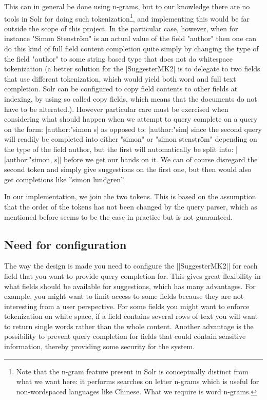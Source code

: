 This can in general be done using n-grams, but to our knowledge there are no tools in Solr for doing such tokenization\footnote{Note that the n-gram feature present in Solr is conceptually distinct from what we want here: it performs searches on letter n-grams which is useful for non-wordspaced languages like Chinese. What we require is word n-grams.}, and implementing this would be far outside the scope of this project. In the particular case, however, when for instance "Simon Stenström" is an actual value of the field "author" then one can do this kind of full field content completion quite simply by changing the type of the field "author" to some string based type that does not do whitespace tokenization (a better solution for the |SuggesterMK2| is to delegate to two fields that use different tokenization, which would yield both word and full text completion. Solr can be configured to copy field contents to other fields at indexing, by using so called copy fields, which means that the documents do not have to be alterated.).
However particular care must be exercised when considering what should happen when we attempt to query complete on a query on the form: |author:"simon s| as opposed to: |author:"sim| since the second query will readily be completed into either "simon" or "simon stenström" depending on the type of the field author, but the first will automatically be split into: |[author:"simon, s]| before we get our hands on it. We can of course disregard the second token and simply give suggestions on the first one, but then would also get completions like ''simon lundgren''.

In our implementation, we join the two tokens. This is based on the assumption that the order of the tokens has not been changed by the query parser, which as mentioned before seems to be the case in practice but is not guaranteed. 


\subsection{Need for configuration}

The way the design is made you need to configure the ||SuggesterMK2|| for each field that you want to provide query completion for. This gives great flexibility in what fields should be available for suggestions, which has many advantages. For example, you might want to limit access to some fields because they are not interesting from a user perspective. For some fields you might want to enforce tokenization on white space, if a field contains several rows of text you will want to return single words rather than the whole content.  Another advantage is the possibility to prevent query completion for fields that could contain sensitive information, thereby providing some security for the system.

